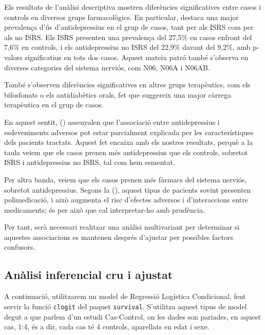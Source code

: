 \documentclass[
]{article}
\begin{document}
Els resultats de l'anàlisi descriptiva mostren diferències
significatives entre casos i controls en diversos grups farmacològics.
En particular, destaca una major prevalença d'ús d'antidepressius en el
grup de casos, tant per als ISRS com per als no ISRS. Els ISRS presenten
una prevalença del 27,5\% en casos enfront del 7,6\% en controls, i els
antidepressius no ISRS del 22,9\% davant del 9,2\%, amb p-valors
significatius en tots dos casos. Aquest mateix patró també s'observa en
diverses categories del sistema nerviós, com N06, N06A i N06AB.

També s'observen diferències significatives en altres grups terapèutics,
com els bifosfonats o els antidiabètics orals, fet que suggereix una
major càrrega terapèutica en el grup de casos.

En aquest sentit, () assenyalen que l'associació entre antidepressius i
esdeveniments adversos pot estar parcialment explicada per les
característiques dels pacients tractats. Aquest fet encaixa amb els
nostres resultats, perquè a la taula veiem que els casos prenen més
antidepressius que els controls, sobretot ISRS i antidepressius no ISRS,
tal com hem esmentat.

Per altra banda, veiem que els casos prenen més fàrmacs del sistema
nerviós, sobretot antidepressius. Segons la
(), aquest
tipus de pacients sovint presenten polimedicació, i això augmenta el
risc d'efectes adversos i d'interaccions entre medicaments; és per això
que cal interpretar-ho amb prudència.

Per tant, serà necessari realitzar una anàlisi multivariant per
determinar si aquestes associacions es mantenen després d'ajustar per
possibles factors confusors.

\clearpage

\subsection{Anàlisi inferencial cru i
ajustat}\label{anuxe0lisi-inferencial-cru-i-ajustat}

A continuació, utilitzarem un model de Regressió Logística Condicional,
fent servir la funció \texttt{clogit} del paquet \texttt{survival}.
S'utilitza aquest tipus de model degut a que parlem d'un estudi
Cas-Control, on les dades son pariades, en aquest cas, 1:4, és a dir,
cada cas té 4 controls, aparellats en edat i sexe.
\end{document}
